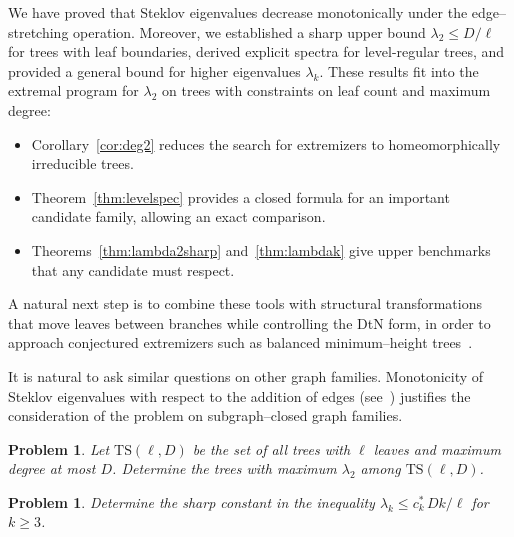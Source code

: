 \documentclass[11pt]{article}
\newtheorem{problem}[theorem]{Problem}
\theoremstyle{definition}
\theoremstyle{remark}
\begin{document}
We have proved that Steklov eigenvalues decrease monotonically under the edge--stretching operation. Moreover, we established a sharp upper bound $\lambda_2\le D/\ell$ for trees with leaf boundaries, derived explicit spectra for level-regular trees, and provided a general bound for higher eigenvalues $\lambda_k$.
These results fit into the extremal program for $\lambda_2$ on trees with constraints on leaf count and maximum degree:
\begin{itemize}[leftmargin=2em]
\item Corollary~\ref{cor:deg2} reduces the search for extremizers to homeomorphically irreducible trees.
\item Theorem~\ref{thm:levelspec} provides a closed formula for an important candidate family, allowing an exact comparison.
\item Theorems~\ref{thm:lambda2sharp} and~\ref{thm:lambdak} give upper benchmarks that any candidate must respect.
\end{itemize}
A natural next step is to combine these tools with structural transformations that move leaves between branches while controlling the DtN form, in order to approach conjectured extremizers such as balanced minimum--height trees~\cite{LinZhaoPlanar}.

It is natural to ask similar questions on other graph families.
Monotonicity of Steklov eigenvalues with respect to the addition of edges (see~\cite[Theorem~3.1]{LinZhaoPlanar}) justifies the consideration of the problem on subgraph--closed graph families.

\begin{problem}\label{prob:TS}
Let $\mathrm{TS}(\ell,D)$ be the set of all trees with $\ell$ leaves and maximum degree at most $D$.
Determine the trees with maximum $\lambda_2$ among $\mathrm{TS}(\ell,D)$.
\end{problem}

\begin{problem}\label{prob:lambdak}
Determine the sharp constant in the inequality $\lambda_k\le c_k^*\,Dk/\ell$ for $k\ge 3$.
\end{problem}
\end{document}
